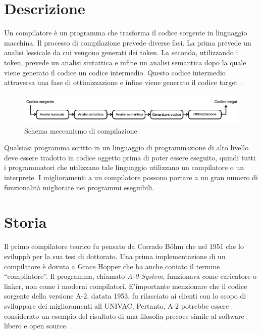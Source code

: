 \documentclass[12pt, a4paper]{report}
\begin{document}
\section{Descrizione}
Un compilatore è un programma che trasforma il codice sorgente in linguaggio macchina. Il processo di compilazione prevede diverse fasi. La prima prevede un analisi lessicale da cui vengono generati dei token. La seconda, utilizzando i token, prevede un analisi sintattica e infine un analisi semantica dopo la quale viene generato il codice un codice intermedio. Questo codice intermedio attraversa una fase di ottimizzazione e infine viene generato il codice target \cite{GCC} \cite{LLVM}.


\begin{figure}
\centering
\includegraphics[width = \textwidth]{SchemaCompilatore.png}
\caption{Schema meccanismo di compilazione}
\label{Fig:MeccanismoCompilazione}
\end{figure}%

Qualsiasi programma scritto in un linguaggio di programmazione di alto livello deve essere tradotto in codice oggetto prima di poter essere eseguito, quindi tutti i programmatori che utilizzano tale linguaggio utilizzano un compilatore o un interprete. I miglioramenti a un compilatore possono portare a un gran numero di funzionalità migliorate nei programmi eseguibili.

\section{Storia}
Il primo compilatore teorico fu pensato da Corrado Böhm che nel 1951 che lo sviluppò per la sua tesi di dottorato. Una prima implementazione di un compilatore è dovuta a Grace Hopper che ha anche coniato il termine ``compilatore''. Il programma, chiamato \textit{A-0 System}\cite{SystemA0}, funzionava come caricatore o linker, non come i moderni compilatori. E'importante menzionare che il codice sorgente della versione A-2, datata 1953, fu rilasciato ai clienti con lo scopo di sviluppare dei miglioramenti all UNIVAC, Pertanto, A-2 potrebbe essere considerato un esempio del risultato di una filosofia precoce simile al software libero e open source.  \cite{openSource1, openOrg, stallman2003software}.
\end{document}
